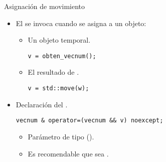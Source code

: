 \begin{frame}[t,fragile]{Asignación de movimiento}
\begin{itemize}
  \item El  se invoca cuando
        se asigna a un objeto:
    \begin{itemize}
      \item Un objeto temporal.
\begin{lstlisting}
v = obten_vecnum();
\end{lstlisting}

      \item El resultado de .
\begin{lstlisting}
v = std::move(w);
\end{lstlisting}
    \end{itemize}

  \item Declaración del .
\begin{lstlisting}
vecnum & operator=(vecnum && v) noexcept;
\end{lstlisting}
    \begin{itemize}
      \item Parámetro de tipo  (\cppkey{\&\&}).
      \item Es recomendable que sea .
    \end{itemize}
\end{itemize}
\end{frame}

